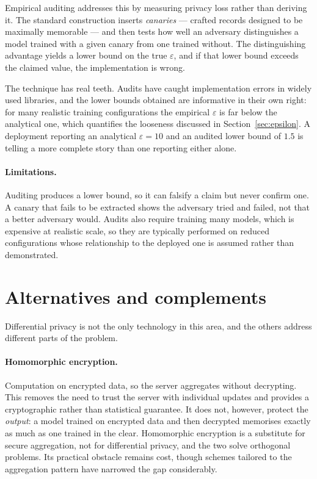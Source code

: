 \documentclass[11pt,a4paper]{article}
\begin{document}
Empirical auditing addresses this by measuring privacy loss rather than
deriving it. The standard construction inserts \emph{canaries} --- crafted
records designed to be maximally memorable --- and then tests how well an
adversary distinguishes a model trained with a given canary from one trained
without. The distinguishing advantage yields a lower bound on the true
$\varepsilon$, and if that lower bound exceeds the claimed value, the
implementation is wrong.

The technique has real teeth. Audits have caught implementation errors in
widely used libraries, and the lower bounds obtained are informative in their
own right: for many realistic training configurations the empirical
$\varepsilon$ is far below the analytical one, which quantifies the looseness
discussed in Section~\ref{sec:epsilon}. A deployment reporting an analytical
$\varepsilon = 10$ and an audited lower bound of $1.5$ is telling a more
complete story than one reporting either alone.

\paragraph{Limitations.}
Auditing produces a lower bound, so it can falsify a claim but never confirm
one. A canary that fails to be extracted shows the adversary tried and failed,
not that a better adversary would. Audits also require training many models,
which is expensive at realistic scale, so they are typically performed on
reduced configurations whose relationship to the deployed one is assumed
rather than demonstrated.

\section{Alternatives and complements}
\label{sec:alternatives}

Differential privacy is not the only technology in this area, and the others
address different parts of the problem.

\paragraph{Homomorphic encryption.}
Computation on encrypted data, so the server aggregates without decrypting.
This removes the need to trust the server with individual updates and provides
a cryptographic rather than statistical guarantee. It does not, however,
protect the \emph{output}: a model trained on encrypted data and then
decrypted memorises exactly as much as one trained in the clear. Homomorphic
encryption is a substitute for secure aggregation, not for differential
privacy, and the two solve orthogonal problems. Its practical obstacle remains
cost, though schemes tailored to the aggregation pattern have narrowed the gap
considerably.
\end{document}

